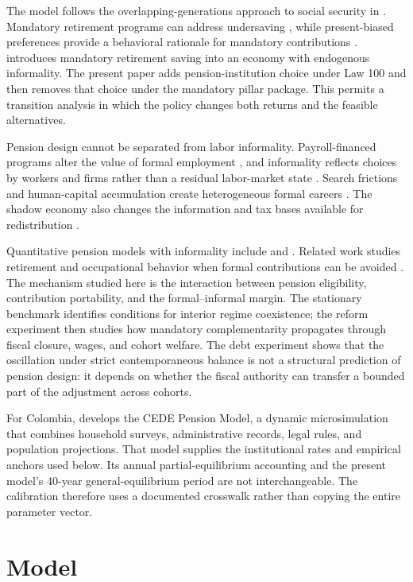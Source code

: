\documentclass[12pt]{article}
\newcommand{\1}{\mathbf{1}}
\begin{document}
The model follows the overlapping-generations approach to social security in
\citet{Diamond1977}. Mandatory retirement programs can address undersaving
\citep{Feldstein1985}, while present-biased preferences provide a behavioral rationale for
mandatory contributions \citep{Laibson1998,Imrohoroglu2003}. \citet{Pardo2023} introduces
mandatory retirement saving into an economy with endogenous informality. The present paper
adds pension-institution choice under Law 100 and then removes that choice under the mandatory
pillar package. This permits a transition analysis in which the policy changes both returns
and the feasible alternatives.

Pension design cannot be separated from labor informality. Payroll-financed programs alter
the value of formal employment \citep{Levy2008}, and informality reflects choices by workers
and firms rather than a residual labor-market state \citep{Ulyssea2018}. Search frictions and
human-capital accumulation create heterogeneous formal careers \citep{Bobba2021}. The shadow
economy also changes the information and tax bases available for redistribution
\citep{DoligalskiRojas2023}.

Quantitative pension models with informality include \citet{Joubert2015} and
\citet{McKiernan2020}. Related work studies retirement and occupational behavior when formal
contributions can be avoided \citep{Ferreira2020,Moreno2022}. The mechanism studied here is the
interaction between pension eligibility, contribution portability, and the formal--informal
margin. The stationary benchmark identifies conditions for interior regime coexistence; the
reform experiment then studies how mandatory complementarity propagates through fiscal
closure, wages, and cohort welfare. The debt experiment shows that the oscillation under
strict contemporaneous balance is not a structural prediction of pension design: it depends
on whether the fiscal authority can transfer a bounded part of the adjustment across cohorts.


For Colombia, \citet{Becerra2025} develops the CEDE Pension Model, a dynamic microsimulation
that combines household surveys, administrative records, legal rules, and population
projections. That model supplies the institutional rates and empirical anchors used below.
Its annual partial-equilibrium accounting and the present model's 40-year general-equilibrium
period are not interchangeable. The calibration therefore uses a documented crosswalk rather
than copying the entire parameter vector.
\section{Model}
\end{document}
